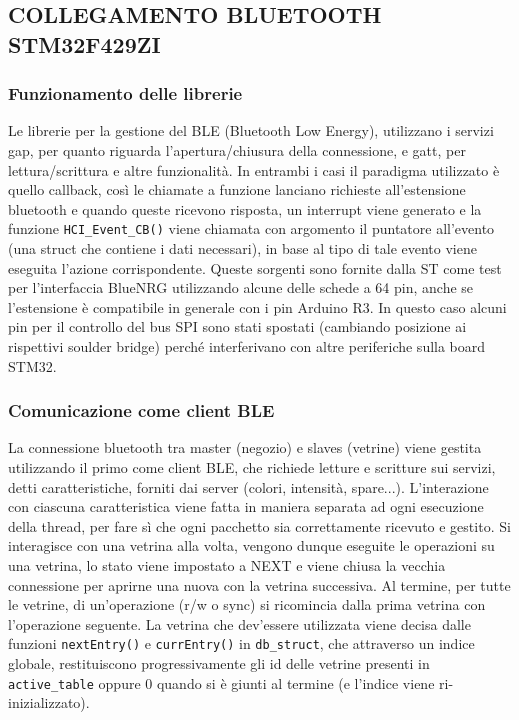 \subsection{COLLEGAMENTO BLUETOOTH STM32F429ZI}

\subsubsection{Funzionamento delle librerie}

Le librerie per la gestione del BLE (Bluetooth Low Energy), utilizzano i servizi gap, per quanto riguarda l'apertura/chiusura della connessione, e gatt, per lettura/scrittura e altre funzionalit\`a. In entrambi i casi il paradigma utilizzato \`e quello callback, cos\`i le chiamate a funzione lanciano richieste all'estensione bluetooth e quando queste ricevono risposta, un interrupt viene generato e la funzione \texttt{HCI\_Event\_CB()} viene chiamata con argomento il puntatore all'evento (una struct che contiene i dati necessari), in base al tipo di tale evento viene eseguita l'azione corrispondente. 
Queste sorgenti sono fornite dalla ST come test per l'interfaccia BlueNRG utilizzando alcune delle schede a 64 pin, anche se l'estensione \`e compatibile in generale con i pin Arduino R3. In questo caso alcuni pin per il controllo del bus SPI sono stati spostati (cambiando posizione ai rispettivi soulder bridge) perch\'e interferivano con altre periferiche sulla board STM32.

\subsubsection{Comunicazione come client BLE}


La connessione bluetooth tra master (negozio) e slaves (vetrine) viene gestita utilizzando il primo come client BLE, che richiede letture e scritture sui servizi, detti caratteristiche, forniti dai server (colori, intensit\`a, spare...). L'interazione con ciascuna caratteristica viene fatta in maniera separata ad ogni esecuzione della thread, per fare s\`i che ogni pacchetto sia correttamente ricevuto e gestito. Si interagisce con una vetrina alla volta, vengono dunque eseguite le operazioni su una vetrina, lo stato viene impostato a NEXT e viene chiusa la vecchia connessione per aprirne una nuova con la vetrina successiva. Al termine, per tutte le vetrine, di un'operazione (r/w o sync) si ricomincia dalla prima vetrina con l'operazione seguente. La vetrina che dev'essere utilizzata viene decisa dalle funzioni \texttt{nextEntry()} e \texttt{currEntry()} in \texttt{db\_struct}, che attraverso un indice globale, restituiscono progressivamente gli id delle vetrine presenti in \texttt{active\_table} oppure 0 quando si \`e giunti al termine (e l'indice viene ri-inizializzato). 


